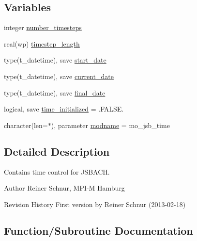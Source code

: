 \subsection*{Variables}
\begin{DoxyCompactItemize}
\item 
integer \hyperlink{namespacemo__jsb__time_ab33d9e53cde817560aa3730633ea1413}{number\+\_\+timesteps}
\item 
real(wp) \hyperlink{namespacemo__jsb__time_ad760ff14bc3e4b8e9d624706973ee1a4}{timestep\+\_\+length}
\item 
type(t\+\_\+datetime), save \hyperlink{namespacemo__jsb__time_afa7b526c3dff7e0c063d6545e6eae499}{start\+\_\+date}
\item 
type(t\+\_\+datetime), save \hyperlink{namespacemo__jsb__time_a1a0e4eb7d850630c29d3e80a77cac78b}{current\+\_\+date}
\item 
type(t\+\_\+datetime), save \hyperlink{namespacemo__jsb__time_a6ee919b8447b1554b208420eb0760e95}{final\+\_\+date}
\item 
logical, save \hyperlink{namespacemo__jsb__time_ac404f6055d48b37e7de92b0e288f5a8c}{time\+\_\+initialized} = .F\+A\+L\+S\+E.
\item 
character(len=$\ast$), parameter \hyperlink{namespacemo__jsb__time_a44d3acf17e06ee576cf456b9fa721952}{modname} = \textquotesingle{}mo\+\_\+jsb\+\_\+time\textquotesingle{}
\end{DoxyCompactItemize}


\subsection{Detailed Description}
Contains time control for J\+S\+B\+A\+C\+H. 

\begin{DoxyAuthor}{Author}
Reiner Schnur, M\+P\+I-\/\+M Hamburg
\end{DoxyAuthor}
\begin{DoxyParagraph}{Revision History}
First version by Reiner Schnur (2013-\/02-\/18) 
\end{DoxyParagraph}


\subsection{Function/\+Subroutine Documentation}
\hypertarget{namespacemo__jsb__time_a6b454a27050a101777b380f81321b779}{}
